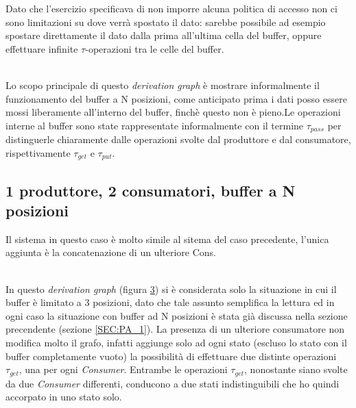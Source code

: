 \documentclass[a4paper]{article}
\begin{document}
Dato che l'esercizio specificava di non imporre alcuna politica di accesso non ci sono limitazioni su dove verrà spostato il dato: sarebbe possibile ad esempio spostare direttamente il dato dalla prima all'ultima cella del buffer, oppure effettuare infinite $\tau$-operazioni tra le celle del buffer.\\
\begin{figure}[!ht]
  \label{FIG:ES3Setting1DG}
\end{figure}\\
Lo scopo principale di questo \textit{derivation graph} è mostrare informalmente il funzionamento del buffer a N posizioni, come anticipato prima i dati posso essere mossi liberamente all'interno del buffer, finchè questo non è pieno.Le operazioni interne al buffer sono state rappresentate informalmente con il termine $\tau_{pass}$ per distinguerle chiaramente dalle operazioni svolte dal produttore e dal consumatore, rispettivamente $\tau_{get}$ e $\tau_{put}$.


\subsection{1 produttore, 2 consumatori, buffer a N posizioni}
\label{SEC:PA2}
Il sistema in questo caso è molto simile al sitema del caso precedente, l'unica aggiunta è la concatenazione di un ulteriore Cons.\\
\begin{figure}[!ht]
  \label{FIG:ES3Setting2SYS}
\end{figure}
\begin{figure}[!ht]
  \label{FIG:ES3Setting2DG}
\end{figure}\\
In questo \textit{derivation graph} (figura \ref{FIG:ES3Setting2DG}) si è considerata solo la situazione in cui il buffer è limitato a 3 posizioni, dato che tale assunto semplifica la lettura ed in ogni caso la situazione con buffer ad N posizioni è stata già discussa nella sezione precendente (sezione \ref{SEC:PA_1}).
La presenza di un ulteriore consumatore non modifica molto il grafo, infatti aggiunge solo ad ogni stato (escluso lo stato con il buffer completamente vuoto) la possibilità di effettuare due distinte operazioni $\tau_{get}$, una per ogni \textit{Consumer}.
Entrambe le operazioni $\tau_{get}$, nonostante siano svolte da due \textit{Consumer} differenti, conducono a due stati indistinguibili che ho quindi accorpato in uno stato solo.
\end{document}
